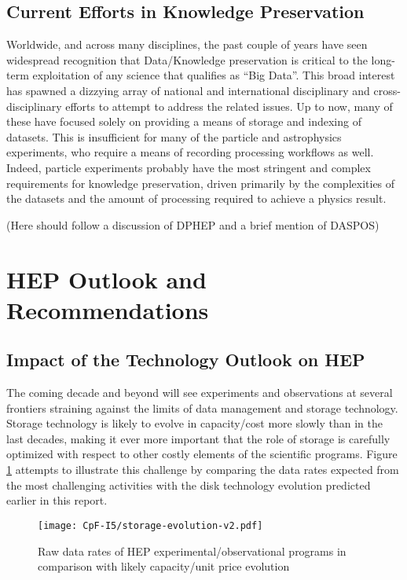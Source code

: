 \subsection{Current Efforts in Knowledge Preservation}
Worldwide, and across many disciplines, the past couple of years have seen widespread 
recognition that Data/Knowledge preservation is critical to the long-term exploitation 
of any science that qualifies as ``Big Data''.  This broad interest has spawned a 
dizzying array of national and international disciplinary and cross-disciplinary 
efforts to attempt to address the related issues.  Up to now, many of these have 
focused solely on providing a means of storage and indexing of datasets.  This is 
insufficient for many of the particle and astrophysics experiments, who require a 
means of recording processing workflows as well.  Indeed, particle experiments 
probably have the most stringent and complex requirements for knowledge 
preservation, driven primarily by the complexities of the datasets and the amount 
of processing required to achieve a physics result.

(Here should follow a discussion of DPHEP and a brief mention of DASPOS)

\section{HEP Outlook and Recommendations}
\label{sec:cpfi5-hep-outlook}
\subsection{Impact of the Technology Outlook on HEP}
The coming decade and beyond will see experiments and observations at several 
frontiers straining against the limits of data management and storage technology.  
Storage technology is likely to evolve in capacity/cost more slowly than in the 
last decades, making it ever more important that the role of storage is carefully 
optimized with respect to other costly elements of the scientific programs.  
Figure \ref{fig:storage-evolution} attempts to illustrate this challenge by comparing the data rates 
expected from the most challenging activities with the disk technology evolution 
predicted earlier in this report.  

\begin{figure}[h]
\centering
\texttt{[image: CpF-I5/storage-evolution-v2.pdf]}
\caption{Raw data rates of HEP experimental/observational programs in comparison with likely capacity/unit price evolution}
\label{fig:storage-evolution}
\end{figure}

